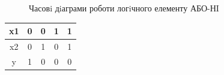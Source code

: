 \documentclass[a4paper,14pt]{extreport}
\begin{document}
\clearpage
\begin{figure}[h]
	\caption{Часовi дiаграми роботи логiчного елементу АБО-НI}
	\label{ris2}
\end{figure}
\begin{table}[h!]
	\begin{center}
	\begin{tabular}{|c|c|c|c|c|}
	\hline
	x1 & 0 & 0 & 1 & 1 \\ \hline
	x2 & 0 & 1 & 0 & 1 \\ \hline
	y  & 1 & 0 & 0 & 0 \\ \hline
	\end{tabular}
	\end{center}
\end{table}
\end{document}
